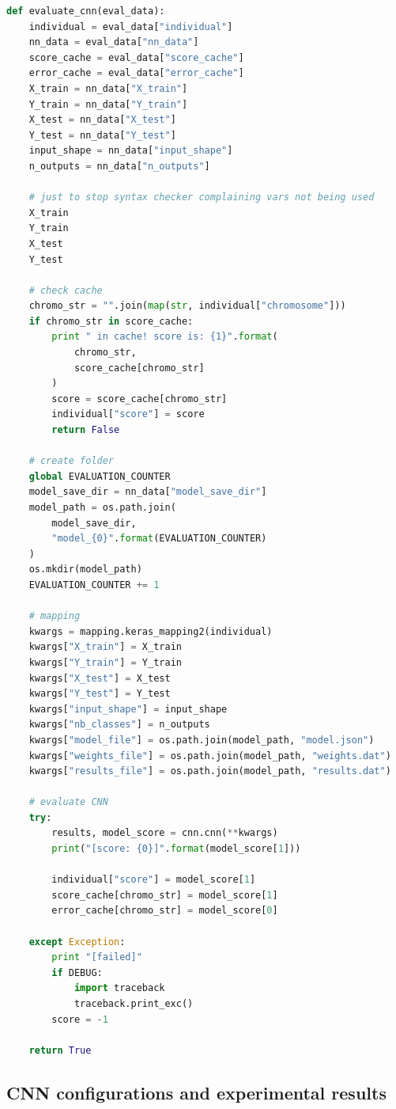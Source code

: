 \begin{lstlisting}[language=Python, caption="Evaluation Function of the GA CNN Tuner"]
def evaluate_cnn(eval_data):
	individual = eval_data["individual"]
	nn_data = eval_data["nn_data"]
	score_cache = eval_data["score_cache"]
	error_cache = eval_data["error_cache"]
	X_train = nn_data["X_train"]
	Y_train = nn_data["Y_train"]
	X_test = nn_data["X_test"]
	Y_test = nn_data["Y_test"]
	input_shape = nn_data["input_shape"]
	n_outputs = nn_data["n_outputs"]
	
	# just to stop syntax checker complaining vars not being used
	X_train
	Y_train
	X_test
	Y_test
	
	# check cache
	chromo_str = "".join(map(str, individual["chromosome"]))
	if chromo_str in score_cache:
		print " in cache! score is: {1}".format(
			chromo_str,
			score_cache[chromo_str]
		)
		score = score_cache[chromo_str]
		individual["score"] = score
		return False
	
	# create folder
	global EVALUATION_COUNTER
	model_save_dir = nn_data["model_save_dir"]
	model_path = os.path.join(
		model_save_dir,
		"model_{0}".format(EVALUATION_COUNTER)
	)
	os.mkdir(model_path)
	EVALUATION_COUNTER += 1
	
	# mapping
	kwargs = mapping.keras_mapping2(individual)
	kwargs["X_train"] = X_train
	kwargs["Y_train"] = Y_train
	kwargs["X_test"] = X_test
	kwargs["Y_test"] = Y_test
	kwargs["input_shape"] = input_shape
	kwargs["nb_classes"] = n_outputs
	kwargs["model_file"] = os.path.join(model_path, "model.json")
	kwargs["weights_file"] = os.path.join(model_path, "weights.dat")
	kwargs["results_file"] = os.path.join(model_path, "results.dat")
	
	# evaluate CNN
	try:
		results, model_score = cnn.cnn(**kwargs)
		print("[score: {0}]".format(model_score[1]))
		
		individual["score"] = model_score[1]
		score_cache[chromo_str] = model_score[1]
		error_cache[chromo_str] = model_score[0]
	
	except Exception:
		print "[failed]"
		if DEBUG:
			import traceback
			traceback.print_exc()
		score = -1

	return True
\end{lstlisting}

\subsection{CNN configurations and experimental results}
\label{sup:cnn_config_result}

